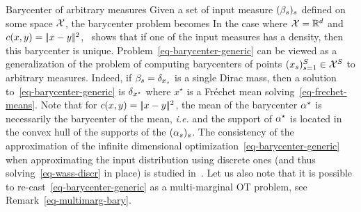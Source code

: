 \begin{rem}{Barycenter of arbitrary measures}
	Given a set of input measure $(\beta_s)_s$ defined on some space $\mathcal{X}$, the barycenter problem becomes 
	In the case where $\mathcal{X}=\mathbb{R}^d$ and $c(x,y)=|\!| x-y |\!|^2$,~\cite{Carlier_wasserstein_barycenter} shows that if one of the input measures has a density, then this barycenter is unique. 
	Problem~\eqref{eq-barycenter-generic} can be viewed as a generalization of the problem of computing barycenters of points $(x_s)_{s=1}^S \in \mathcal{X}^S$ to arbitrary measures. Indeed, if $\beta_s=\delta_{x_s}$ is a single Dirac mass, then a solution to~\eqref{eq-barycenter-generic} is $\delta_{x^\star}$ where $x^\star$ is a Fr\'echet mean solving~\eqref{eq-frechet-means}.
	Note that for $c(x,y)=|\!| x-y |\!|^2$, the mean of the barycenter $\alpha^\star$ is necessarily the barycenter of the mean, \emph{i.e.} 
	and the support of $\alpha^\star$ is located in the convex hull of the supports of the $(\alpha_s)_s$.
	The consistency of the approximation of the infinite dimensional optimization~\eqref{eq-barycenter-generic} when approximating the input distribution using discrete ones (and thus solving~\eqref{eq-wass-discr} in place) is studied in~\cite{Carlier-NumericsBarycenters}.
	Let us also note that it is possible to re-cast~\eqref{eq-barycenter-generic} as a multi-marginal OT problem, see Remark~\ref{eq-multimarg-bary}. 
\end{rem}


